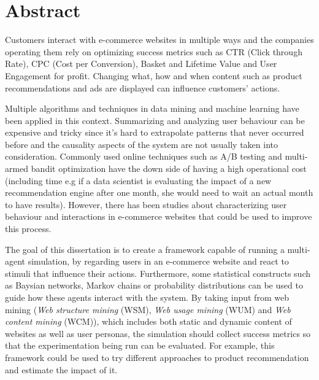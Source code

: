 \chapter*{Abstract}


Customers interact with e-commerce websites in multiple ways and the
companies operating them rely on optimizing success metrics such as
CTR (Click through Rate), CPC (Cost per Conversion), Basket and Lifetime
Value and User Engagement for profit. Changing what, how and when content
such as product recommendations and ads are displayed can influence
customers' actions.

Multiple algorithms and techniques in data mining and machine learning
have been applied in this context. Summarizing and analyzing user
behaviour can be expensive and tricky since it's hard to extrapolate
patterns that never occurred before and the causality aspects of the
system are not usually taken into consideration. Commonly used online
techniques such as A/B testing and multi-armed bandit optimization have
the down side of having a high operational cost (including time e.g if
a data scientist is evaluating the impact of a new recommendation engine
after one month, she would need to wait an actual month to have results).
However, there has been studies about characterizing user behaviour and
interactions in e-commerce websites that could be used to improve this
process.

The goal of this dissertation is to create a framework capable of running
a multi-agent simulation, by regarding users in an e-commerce website and
react to stimuli that influence their actions. Furthermore, some statistical
constructs such as Baysian networks, Markov chains or probability
distributions can be used to guide how these agents interact with the
system. By taking input from web mining (\emph{Web structure mining} (WSM),
\emph{Web usage mining} (WUM) and \emph{Web content mining} (WCM)), which
includes both static and dynamic content of websites as well as user
personas, the simulation should collect success metrics so that the
experimentation being run can be evaluated. For example, this framework
could be used to try different approaches to product recommendation and
estimate the impact of it.


